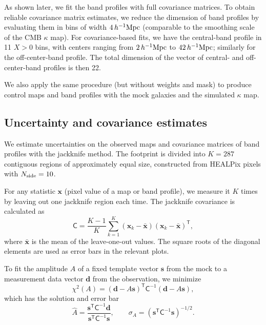 \documentclass[twocolumn,anonymous,linenumbers]{aastex701}
\newcommand{\hinvMpc}{h^{-1}{\rm Mpc}}
\begin{document}
As shown later, we fit the band profiles with full covariance matrices. To obtain reliable covariance matrix estimates, we reduce the dimension of band profiles by evaluating them in bins of width $4\,\hinvMpc$ (comparable to the smoothing scale of the CMB $\kappa$ map).  For covariance-based fits, we have the central-band profile in 11 $X>0$ bins, with centers ranging from $2\,\hinvMpc$ to $42\,\hinvMpc$; similarly for the off-center-band profile. The total dimension of the vector of central- and off-center-band profiles is then 22.

We also apply the same procedure (but without weights and mask) to produce control maps and band profiles with the mock galaxies and the simulated $\kappa$ map.

\subsection{Uncertainty and covariance estimates}
\label{sec:errors}

We estimate uncertainties on the observed maps and covariance matrices of band profiles with the jackknife method. 
The footprint is divided into $K=287$ contiguous regions of
approximately equal size, constructed from HEALPix pixels with
$N_{\rm side}=10$. 

For any statistic $\mathbf{x}$ (pixel value of a map or band profile), we measure it $K$ times by leaving out one jackknife region each time. The jackknife covariance is calculated as
\begin{equation}
  \mathsf{C}=\frac{K-1}{K}\sum_{k=1}^{K}(\mathbf{x}_{k}-\bar{\mathbf{x}})
                                          (\mathbf{x}_{k}-\bar{\mathbf{x}})^{\mathsf T},
  \label{eq:jackknife}
\end{equation}
where $\bar{\mathbf{x}}$ is the mean of the leave-one-out values. The square roots of the diagonal elements are used as error bars in the relevant plots. 

To fit the amplitude $A$ of a fixed template vector $\mathbf{s}$ from the mock to a measurement data vector $\mathbf{d}$ from the observation, we minimize
\begin{equation}
  \chi^{2}(A) =(\mathbf{d}-A\mathbf{s})^{\mathsf T}\mathsf{C}^{-1}
                 (\mathbf{d}-A\mathbf{s}), 
\end{equation}
which has the solution and error bar
\begin{equation}
  \hat A =\frac{\mathbf{s}^{\mathsf T}\mathsf{C}^{-1}\mathbf{d}}
                 {\mathbf{s}^{\mathsf T}\mathsf{C}^{-1}\mathbf{s}}, \qquad
  \sigma_{A}=\left(\mathbf{s}^{\mathsf T}\mathsf{C}^{-1}\mathbf{s}\right)^{-1/2}.
  \label{eq:amplitude}
\end{equation}
\end{document}
